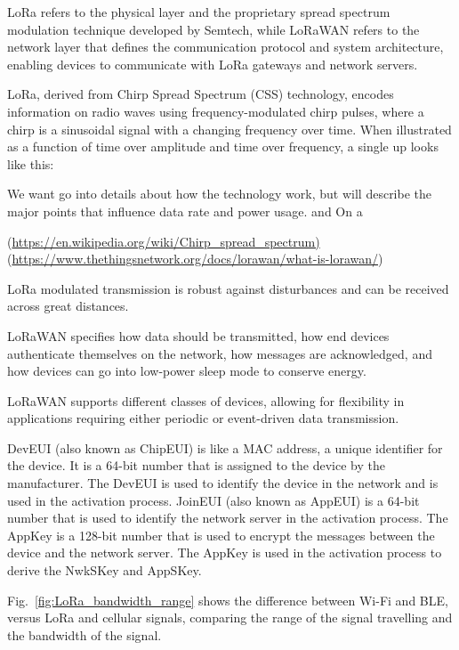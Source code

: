 \ac{LoRa} refers to the physical layer and the proprietary spread spectrum modulation technique developed by Semtech, while \ac{LoRaWAN} refers to the network layer that defines the communication protocol and system architecture, enabling devices to communicate with \ac{LoRa} gateways and network servers. 

LoRa, derived from Chirp Spread Spectrum (CSS) technology, encodes information on radio waves using frequency-modulated chirp pulses, where a chirp is a sinusoidal signal with a changing frequency over time. When illustrated as a function of time over amplitude and time over frequency, a single up looks like this:



We want go into details about how the technology work, but will describe the major points that influence data rate and power usage.  and  On a 


(\url{https://en.wikipedia.org/wiki/Chirp_spread_spectrum)}
(\url{https://www.thethingsnetwork.org/docs/lorawan/what-is-lorawan/})

LoRa modulated transmission is robust against disturbances and can be received across great distances.


\ac{LoRaWAN} specifies how data should be transmitted, how end devices authenticate themselves on the network, how messages are acknowledged, and how devices can go into low-power sleep mode to conserve energy.

\ac{LoRaWAN} supports different classes of devices, allowing for flexibility in applications requiring either periodic or event-driven data transmission.

\ac{DevEUI} (also known as ChipEUI) is like a \ac{MAC} address, a unique identifier for the device. It is a 64-bit number that is assigned to the device by the manufacturer. The \ac{DevEUI} is used to identify the device in the network and is used in the activation process. \ac{JoinEUI} (also known as AppEUI) is a 64-bit number that is used to identify the network server in the activation process. The AppKey is a 128-bit number that is used to encrypt the messages between the device and the network server. The AppKey is used in the activation process to derive the NwkSKey and AppSKey.



Fig.~\ref{fig:LoRa_bandwidth_range} shows the difference between Wi-Fi and \ac{BLE}, versus \ac{LoRa} and cellular signals, comparing the range of the signal travelling and the bandwidth of the signal.

